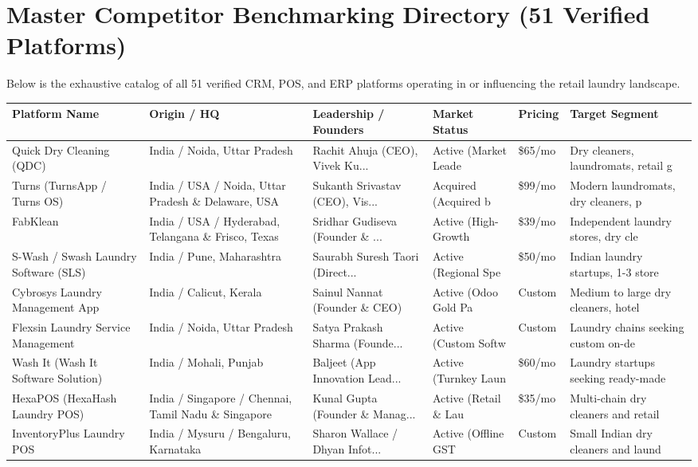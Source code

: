 \documentclass[11pt,a4paper]{article}
\begin{document}
\newpage
\section{Master Competitor Benchmarking Directory (51 Verified Platforms)}

Below is the exhaustive catalog of all 51 verified CRM, POS, and ERP platforms operating in or influencing the retail laundry landscape.

\begin{longtable}{p{3.2cm} p{2.2cm} p{2.5cm} p{2.2cm} p{1.8cm} p{2.5cm}}
\toprule
\textbf{Platform Name} & \textbf{Origin / HQ} & \textbf{Leadership / Founders} & \textbf{Market Status} & \textbf{Pricing} & \textbf{Target Segment} \\
\midrule
\endhead
Quick Dry Cleaning (QDC) & India / Noida, Uttar Pradesh & Rachit Ahuja (CEO), Vivek Ku... & Active (Market Leade & \$65/mo & Dry cleaners, laundromats, retail g \\
\midrule
Turns (TurnsApp / Turns OS) & India / USA / Noida, Uttar Pradesh \& Delaware, USA & Sukanth Srivastav (CEO), Vis... & Acquired (Acquired b & \$99/mo & Modern laundromats, dry cleaners, p \\
\midrule
FabKlean & India / USA / Hyderabad, Telangana \& Frisco, Texas & Sridhar Gudiseva (Founder \& ... & Active (High-Growth  & \$39/mo & Independent laundry stores, dry cle \\
\midrule
S-Wash / Swash Laundry Software (SLS) & India / Pune, Maharashtra & Saurabh Suresh Taori (Direct... & Active (Regional Spe & \$50/mo & Indian laundry startups, 1-3 store  \\
\midrule
Cybrosys Laundry Management App & India / Calicut, Kerala & Sainul Nannat (Founder \& CEO) & Active (Odoo Gold Pa & Custom & Medium to large dry cleaners, hotel \\
\midrule
Flexsin Laundry Service Management & India / Noida, Uttar Pradesh & Satya Prakash Sharma (Founde... & Active (Custom Softw & Custom & Laundry chains seeking custom on-de \\
\midrule
Wash It (Wash It Software Solution) & India / Mohali, Punjab & Baljeet (App Innovation Lead... & Active (Turnkey Laun & \$60/mo & Laundry startups seeking ready-made \\
\midrule
HexaPOS (HexaHash Laundry POS) & India / Singapore / Chennai, Tamil Nadu \& Singapore & Kunal Gupta (Founder \& Manag... & Active (Retail \& Lau & \$35/mo & Multi-chain dry cleaners and retail \\
\midrule
InventoryPlus Laundry POS & India / Mysuru / Bengaluru, Karnataka & Sharon Wallace / Dhyan Infot... & Active (Offline GST  & Custom & Small Indian dry cleaners and laund \\

\end{longtable}
\end{document}
